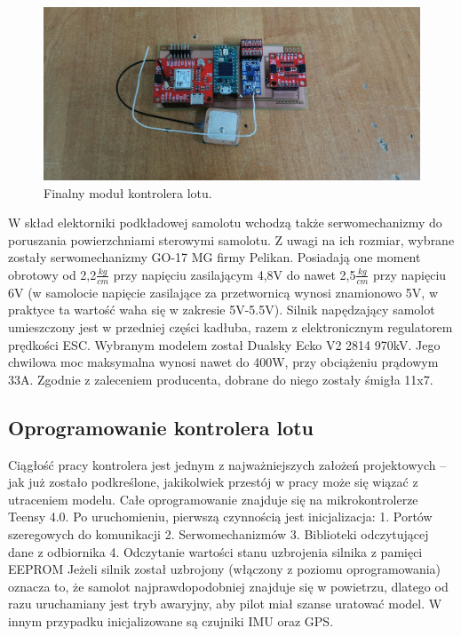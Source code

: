 \documentclass[12pt, a4paper]{article}
\begin{document}
   \begin{figure}[ht]
    \centering
    \includegraphics[width=1\textwidth]{dodokontroler}
    \caption{Finalny moduł kontrolera lotu.}
    \label{dodokontroler}
\end{figure}


W skład elektorniki podkładowej samolotu wchodzą także serwomechanizmy do poruszania powierzchniami sterowymi samolotu. Z uwagi na ich rozmiar, wybrane zostały serwomechanizmy GO-17 MG firmy Pelikan. Posiadają one moment obrotowy od 2,2$\frac{kg}{cm}$ przy napięciu zasilającym 4,8V do nawet 2,5$\frac{kg}{cm}$ przy napięciu 6V (w samolocie napięcie zasilające za przetwornicą wynosi znamionowo 5V, w praktyce ta wartość waha się w zakresie 5V-5.5V). Silnik napędzający samolot umieszczony jest w przedniej części kadłuba, razem z elektronicznym regulatorem prędkości ESC. Wybranym modelem został Dualsky Ecko V2 2814 970kV. Jego chwilowa moc maksymalna wynosi nawet do 400W, przy obciążeniu prądowym 33A. Zgodnie z zaleceniem producenta, dobrane do niego zostały śmigła 11x7.  

 \clearpage
\subsection{Oprogramowanie kontrolera lotu}
Ciągłość pracy kontrolera jest jednym z najważniejszych założeń projektowych – jak już zostało podkreślone, jakikolwiek przestój w pracy może się wiązać z utraceniem modelu. Całe oprogramowanie znajduje się na mikrokontrolerze Teensy 4.0. Po uruchomieniu, pierwszą czynnością jest inicjalizacja:
1.	Portów szeregowych do komunikacji
2.	Serwomechanizmów 
3.	Biblioteki odczytującej dane z odbiornika
4.	Odczytanie wartości stanu uzbrojenia silnika z pamięci EEPROM
Jeżeli silnik został uzbrojony (włączony z poziomu oprogramowania) oznacza to, że samolot najprawdopodobniej znajduje się w powietrzu, dlatego od razu uruchamiany jest tryb awaryjny, aby pilot miał szanse uratować model. W innym przypadku inicjalizowane są czujniki IMU oraz GPS.
\end{document}
